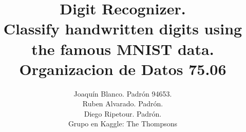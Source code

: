 \documentclass[a4paper,11pt]{report}
\title{Digit Recognizer. \\ 
  Classify handwritten digits using the famous MNIST data.\\
  Organizacion de Datos 75.06}
\author{Joaquín Blanco. Padrón 94653.\\
  Ruben Alvarado. Padrón.\\
  Diego Ripetour. Padrón.\\
  Grupo en Kaggle: The Thompsons}
\begin{document}
\maketitle
\tableofcontents

\begin{abstract}
\end{abstract}

\chapter{}
\end{document}
